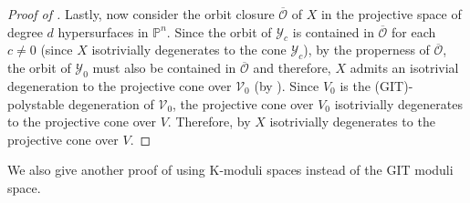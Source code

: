 \documentclass[11pt,reqno]{amsart}
\newcommand{\cO}{\mathcal{O}}
\newcommand{\cV}{\mathcal{V}}
\newcommand{\cY}{\mathcal{Y}}
\newcommand{\PP}{\mathbb{P}}
\numberwithin{equation}{section}
\theoremstyle{definition}
\begin{document}
\begin{proof}[Proof of ]
    Lastly, now consider the orbit closure $\overline{\cO}$ of $X$ in the projective space of degree $d$ hypersurfaces in $\PP^n$. Since the orbit of $\cY_c$ is contained in $\overline{\cO}$ for each $c \neq 0$ (since $X$ isotrivially degenerates to the cone $\cY_c$), by the properness of $\overline{\cO}$, the orbit of $\cY_0$ must also be contained in $\overline{\cO}$ and therefore, $X$ admits an isotrivial degeneration to the projective cone over $\cV_0$ (by ). Since $V_0$ is the (GIT)-polystable degeneration of $\cV_0$, the projective cone over $V_0$ isotrivially degenerates to the projective cone over $V$. Therefore, by  $X$ isotrivially degenerates to the projective cone over $V$.
\end{proof}

We also give another proof of  using K-moduli spaces instead of the GIT moduli space.
\end{document}
